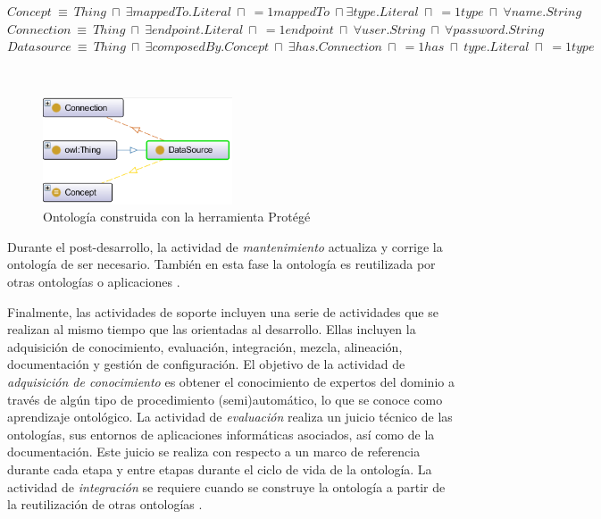 \begin{minipage}{\textwidth}
$Concept \ \equiv \ Thing \ \sqcap \ \exists  mappedTo.Literal \ \sqcap \ =1 mappedTo \ \sqcap \exists  type.Literal \ \sqcap \ =1 type \ \sqcap \ \forall name.String$ \\
$Connection \ \equiv \ Thing \ \sqcap \ \exists endpoint.Literal \ \sqcap \ =1 endpoint \ \sqcap \ \forall user.String \ \sqcap \ \forall password.String $ \\
$Datasource \ \equiv \ Thing \ \sqcap \ \exists composedBy.Concept \ \sqcap \ \exists has.Connection \ \sqcap \ =1 has \ \sqcap \ type.Literal \ \sqcap \ =1 type$ \\
\label{onto:hdrm}
\end{minipage}\\

\begin{figure}
\begin{center}
	\includegraphics[width=0.5\textwidth]{img/ontologiaProtege.png}
\end{center}
\caption{Ontología construida con la herramienta Protégé}
\label{fig: ontologiaProtege}
\end{figure}

Durante el post-desarrollo, la actividad de \textit{mantenimiento} actualiza y corrige la ontología de ser necesario. También en esta fase la ontología es reutilizada por otras ontologías o aplicaciones \citep{Gomez-Perez:2007:OEE:1199560}.

Finalmente, las actividades de soporte incluyen una serie de actividades que se realizan al mismo tiempo que las orientadas al desarrollo. Ellas incluyen la adquisición de conocimiento, evaluación, integración, mezcla, alineación, documentación y gestión de configuración. El objetivo de la actividad de \textit{adquisición de conocimiento} es obtener el conocimiento de expertos del dominio a través de algún tipo de procedimiento (semi)automático, lo que se conoce como aprendizaje ontológico. La actividad de \textit{evaluación} realiza un juicio técnico de las ontologías, sus entornos de aplicaciones informáticas asociados, así como de la documentación. Este juicio se realiza con respecto a un marco de referencia durante cada etapa y entre etapas durante el ciclo de vida de la ontología. La actividad de \textit{integración} se requiere cuando se construye la ontología a partir de la reutilización de otras ontologías \citep{Gomez-Perez:2007:OEE:1199560}.

